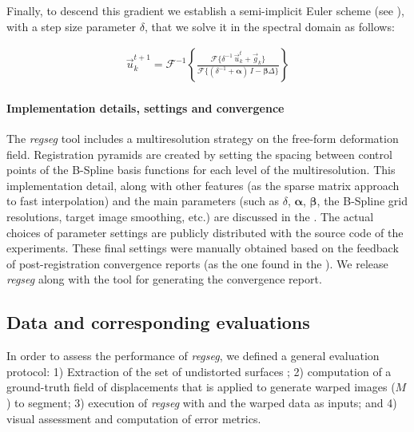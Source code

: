 Finally, to descend this gradient we establish a semi-implicit Euler scheme (see ),
  with a step size parameter $\delta$, that we solve it in the spectral domain as follows:

  \begin{align}
  \vec{u}_k^{t+1} = \mathcal{F}^{-1}\left\{ \frac{\mathcal{F}\{\delta^{-1} \, \vec{u}_k^t + \vec{g}_k\} }%
                  {\mathcal{F}\{(\delta^{-1} + \boldsymbol{\alpha})\, I - \boldsymbol{\beta}\Delta\}} \right\}
  \label{eq:update_equation}
  \end{align}


\paragraph*{Implementation details, settings and convergence}
\label{sec:conv_report}
The \emph{regseg} tool includes a multiresolution strategy on the free-form deformation field.
Registration pyramids are created by setting the spacing between control points of the B-Spline basis
  functions for each level of the multiresolution.
This implementation detail, along with other features (as the sparse matrix approach
  to fast interpolation) and the main parameters 
  (such as $\delta$, $\boldsymbol{\alpha}$, $\boldsymbol{\beta}$, the B-Spline grid resolutions,
  target image smoothing, etc.) are discussed in the .
The actual choices of parameter settings are publicly distributed with the source code of the experiments.
These final settings were manually obtained based on the feedback of post-registration convergence
  reports (as the one found in the ).
We release \emph{regseg} along with the tool for generating the convergence report.

\subsection{Data and corresponding evaluations}
\label{sec:datasets}
In order to assess the performance of \emph{regseg}, we defined a general
  evaluation protocol:
1) Extraction of the set of undistorted surfaces \gammaset{};  
2) computation of a ground-truth field of displacements that is applied to
  generate warped images ($M$) to segment;
3) execution of \emph{regseg} with \gammaset{} and the warped data as inputs; and
4) visual assessment and computation of error metrics.


